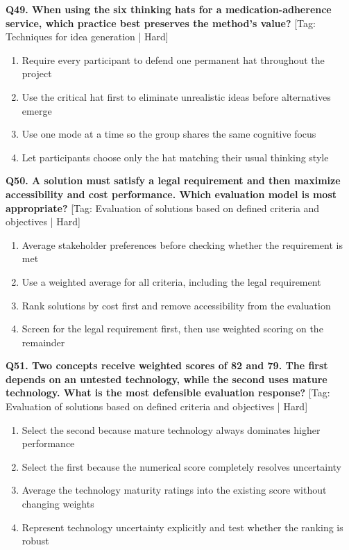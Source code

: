 \noindent\textbf{Q49. When using the six thinking hats for a medication-adherence service, which practice best preserves the method's value?} \hfill [Tag: Techniques for idea generation | Hard]
\begin{enumerate}[label=(\alph*),topsep=2pt,itemsep=1pt,partopsep=0pt,parsep=0pt]
    \item {Require every participant to defend one permanent hat throughout the project}
    \item {Use the critical hat first to eliminate unrealistic ideas before alternatives emerge}
    \item {Use one mode at a time so the group shares the same cognitive focus}
    \item {Let participants choose only the hat matching their usual thinking style}
\end{enumerate}
\vspace{2mm}

\noindent\textbf{Q50. A solution must satisfy a legal requirement and then maximize accessibility and cost performance. Which evaluation model is most appropriate?} \hfill [Tag: Evaluation of solutions based on defined criteria and objectives | Hard]
\begin{enumerate}[label=(\alph*),topsep=2pt,itemsep=1pt,partopsep=0pt,parsep=0pt]
    \item {Average stakeholder preferences before checking whether the requirement is met}
    \item {Use a weighted average for all criteria, including the legal requirement}
    \item {Rank solutions by cost first and remove accessibility from the evaluation}
    \item {Screen for the legal requirement first, then use weighted scoring on the remainder}
\end{enumerate}
\vspace{2mm}

\noindent\textbf{Q51. Two concepts receive weighted scores of 82 and 79. The first depends on an untested technology, while the second uses mature technology. What is the most defensible evaluation response?} \hfill [Tag: Evaluation of solutions based on defined criteria and objectives | Hard]
\begin{enumerate}[label=(\alph*),topsep=2pt,itemsep=1pt,partopsep=0pt,parsep=0pt]
    \item {Select the second because mature technology always dominates higher performance}
    \item {Select the first because the numerical score completely resolves uncertainty}
    \item {Average the technology maturity ratings into the existing score without changing weights}
    \item {Represent technology uncertainty explicitly and test whether the ranking is robust}
\end{enumerate}
\vspace{2mm}

